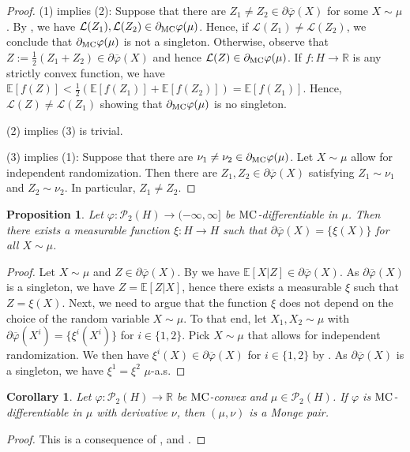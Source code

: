 \documentclass[a4paper]{amsart}
\numberwithin{theorem}{section}
\newtheorem{proposition}[theorem]{Proposition}
\newtheorem{corollary}[theorem]{Corollary}
\theoremstyle{definition}
\newcommand{\R}{\mathbb{R}}
\newcommand{\E}{\mathbb{E}}
\newcommand{\law}{\mathcal{L}}
\newcommand{\Pc}{\mathcal P}
\renewcommand{\H}{H}
\renewcommand{\phi}{\varphi}
\newcommand{\mc}{\textup{MC}}
\newcommand{\MC}{\textup{MC}}
\begin{document}
\begin{proof}
(1) implies (2): Suppose that there are $Z_1 \neq Z_2 \in \partial\overline{\phi}(X)$ for some $X \sim \mu$. By , we have $\law(Z_1), \law(Z_2) \in \partial_\mc\phi(\mu)$. Hence, if $\law(Z_1) \neq \law(Z_2)$, we conclude that $\partial_\mc\phi(\mu)$ is not a singleton. Otherwise, observe that $Z:= \frac12 (Z_1+Z_2) \in \partial\overline{\phi}(X)$ and hence $\law(Z) \in \partial_\mc\phi(\mu)$. If $f : \H \to \R$ is any strictly convex function, we have $\E[f(Z)] < \frac12 (\E[f(Z_1)]+\E[f(Z_2)]) = \E[f(Z_1)]$. Hence, $\law(Z) \neq \law(Z_1)$ showing that $\partial_\mc\phi(\mu)$ is no singleton.

(2) implies (3) is trivial.

(3) implies (1): Suppose that there are $ \nu_1 \neq \nu_2 \in \partial_{\mc}\phi(\mu)$. Let $X \sim \mu$ allow for independent randomization. Then there are $Z_1, Z_2 \in \partial\overline{\phi}(X)$ satisfying $Z_1 \sim \nu_1$ and $Z_2 \sim \nu_2$. In particular, $Z_1 \neq Z_2$.
\end{proof}

\begin{proposition}\label{prop:LdiffXi}
Let $\phi:\Pc_2(\H)\to (-\infty, \infty]$ be $\MC$-differentiable in $\mu$. Then there exists   a measurable function $\xi : \H \to \H$ such that $  \partial\overline{\phi}(X) = \{\xi(X)\}$ for all $X\sim \mu$.
\end{proposition}
\begin{proof}
Let $X \sim \mu$ and $Z \in \partial \overline{\phi}(X)$. By  we have $\E[X|Z] \in \partial \overline{\phi}(X)$. As $\partial \overline{\phi}(X)$ is a singleton, we have $Z=\E[Z|X]$, hence there exists a measurable $\xi$ such that $Z=\xi(X)$. Next, we need to argue that the function $\xi$ does not depend on the choice of the random variable $X \sim \mu$. To that end, let $X_1,X_2 \sim \mu$ with $\partial\overline{\phi}(X^i) = \{ \xi^i(X^i)\}$ for $i \in \{1,2\}$. Pick $X \sim \mu$ that allows for independent randomization. We then have $\xi^i(X) \in \partial\overline{\phi}(X)$ for $i \in \{1,2\}$ by . As $\partial\overline{\phi}(X)$ is a singleton, we have $\xi^1=\xi^2$ $\mu$-a.s. 
\end{proof}




\begin{corollary}\label{cor:impliesheridMonge}
Let $\phi: \Pc_2(\H) \to \R$ be $\mc$-convex and $\mu \in \Pc_2(\H)$. If $\phi$ is $\mc$-differentiable in $\mu$ with  derivative $\nu$, then $(\mu,\nu)$ is a Monge pair.    
\end{corollary}
\begin{proof}
    This is a consequence of ,  and .
\end{proof}
\end{document}
